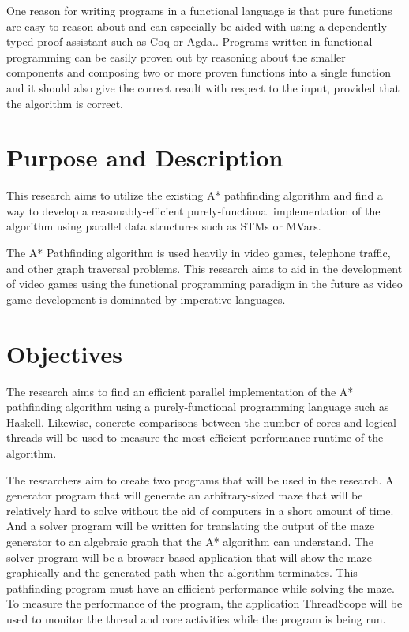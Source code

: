 One reason for writing programs in a functional language is that 
pure functions are easy to reason about and can especially be aided with 
using a dependently-typed proof assistant such as Coq
or Agda.\cite{Breitner2018,SpectorZabusky2018,ElBakouny2017}.
Programs written in functional programming can be easily proven out 
by reasoning about the smaller components and composing two or more proven 
functions into a single function and it should also give the correct result with respect to the input,
provided that the algorithm is correct. \cite{AbelBenkeBove2005}

\section{Purpose and Description}

This research aims to utilize the existing A* pathfinding algorithm
\cite{ZaghloulAlJami2017,WeinstockHolladay}
and find a way to develop a reasonably-efficient purely-functional 
implementation of the algorithm using parallel data structures such 
as STMs or MVars\cite{Marlow2013}.  

The A* Pathfinding algorithm is used heavily in video games, telephone traffic, 
and other graph traversal problems\cite{HartNilssonRaphael1968}. This research 
aims to aid in the development of video games using the functional 
programming paradigm in the future as video game development is dominated 
by imperative languages.

\section{Objectives}
The research aims to find an efficient parallel implementation of the A* pathfinding 
algorithm using a purely-functional programming language such as Haskell. Likewise, 
concrete comparisons between the number of cores and logical threads will be used to measure 
the most efficient performance runtime of the algorithm.

The researchers aim to create two programs that will be used in the research. A generator program
that will generate an arbitrary-sized maze that will be relatively hard to solve without the aid 
of computers in a short amount of time.\cite{Buck2015} And a solver program will be written for translating the output 
of the maze generator to an algebraic graph that the A* algorithm can understand. The solver
program will be a browser-based application that will show the maze graphically and the generated 
path when the algorithm terminates. This pathfinding program must have an efficient performance while solving the maze. 
To measure the performance of the program, the application ThreadScope will be used to monitor the thread and
core activities while the program is being run. \cite{ThreadScope}
